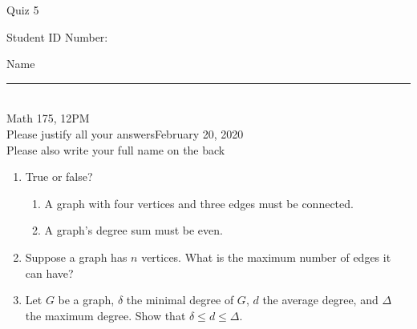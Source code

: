 \documentclass[12pt]{article}
\begin{document}
\begin{flushleft} 
\centerline{\LARGE{Quiz 5}} 
\vspace{5 mm}
{Student ID Number:}\hfill  
{Name \rule {2 in}{0.01in}}\\
Math 175, 12PM
\\
{Please justify all your answers}\hfill {February 20, 2020}
\\
{Please also write your full name on the back} 

\medskip
\end{flushleft}

\begin{enumerate}
	\item True or false?
	\begin{enumerate}
		\item A graph with four vertices and three edges must be connected.
		\item A graph's degree sum must be even.
	\end{enumerate}
	\item Suppose a graph has $n$ vertices. What is the maximum number of edges it can have?
	\vfill
	\item Let $G$ be a graph, $\delta$ the minimal degree of $G$, $d$ the average degree, and $\Delta$ the maximum degree. Show that $\delta \leq d \leq \Delta$.
	\vfill
\end{enumerate}

\end{document}

